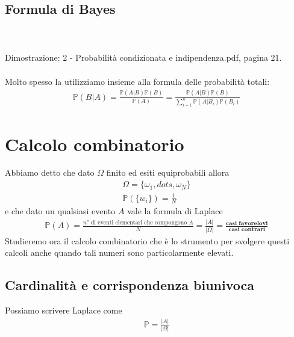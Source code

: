 \documentclass[a4paper,12pt]{article}
\begin{document}
\subsection{Formula di Bayes}
\\
\vspace{1px}\\
Dimostrazione: 2 - Probabilità condizionata e indipendenza.pdf, pagina 21. \\
\vspace{1em}\\
Molto spesso la utilizziamo insieme alla formula delle probabilità totali:
\begin{align*}
  \mathbb{P}(B | A) = \frac{\mathbb{P}(A|B)\mathbb{P}(B)}{\mathbb{P}(A)} = \frac{\mathbb{P}(A|B)\mathbb{P}(B)}{\sum_{i=1}^n \mathbb{P}(A | B_i)\mathbb{P}(B_i)}
\end{align*}
\section{Calcolo combinatorio}
\label{sec:calc_comb}
Abbiamo detto che dato $\Omega$ finito ed esiti equiprobabili allora
\begin{align*}
  \Omega = \{\omega_1, dots, \omega_N\} \\
  \mathbb{P}(\{w_i\}) = \frac{1}{N}
\end{align*}
e che dato un qualsiasi evento $A$ vale la formula di Laplace
\begin{align*}
      \mathbb{P}(A) = \frac{n° \text{ di eventi elementari che compongono $A$}}{N}  = \frac{| A |}{| \Omega |} = \frac{\textbf{casi favorelovi}}{\textbf{casi contrari}}
\end{align*}
Studieremo ora il calcolo combinatorio che è lo strumento per svolgere questi calcoli anche quando tali numeri sono particolarmente elevati.\\
\subsection{Cardinalità e corrispondenza biunivoca}
Possiamo scrivere Laplace come 
\begin{align*}
  \mathbb{P} = \frac{| A |}{| \Omega |}
\end{align*}
\\
\vspace{1px}\\
\end{document}
